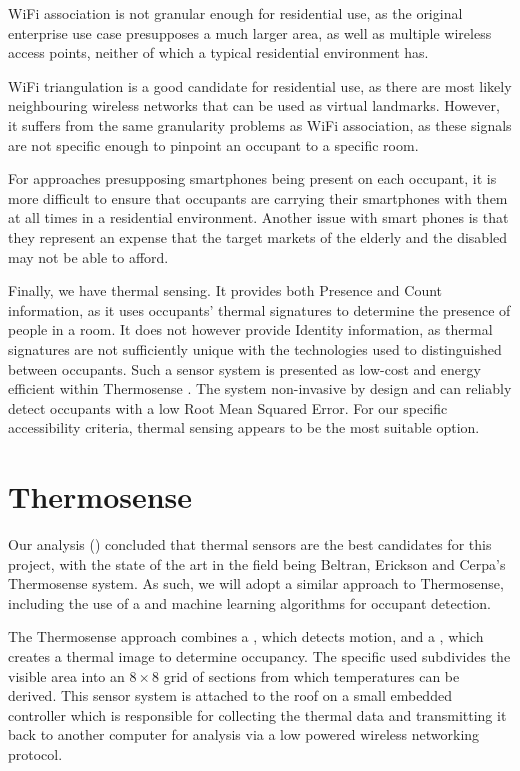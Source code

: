 \documentclass[../thesis/thesis.tex]{subfiles}
\begin{document}
WiFi association is not granular enough for residential use, as the original enterprise use case presupposes a much larger area, as well as multiple wireless access points, neither of which a typical residential environment has.

WiFi triangulation is a good candidate for residential use, as there are most likely neighbouring wireless networks that can be used as virtual landmarks. However, it suffers from the same granularity problems as WiFi association, as these signals are not specific enough to pinpoint an occupant to a specific room.

For approaches presupposing smartphones being present on each occupant, it is more difficult to ensure that occupants are carrying their smartphones with them at all times in a residential environment.  Another issue with smart phones is that they represent an expense that the target markets of the elderly and the disabled may not be able to afford.

Finally, we have thermal sensing. It provides both Presence and Count information, as it uses occupants' thermal signatures to determine the presence of people in a room. It does not however provide Identity information, as thermal signatures are not sufficiently unique with the technologies used to distinguished between occupants. Such a sensor system is presented as low-cost and energy efficient within Thermosense \cite{beltran2013thermosense}. The system non-invasive by design and can reliably detect occupants with a low Root Mean Squared Error. For our specific accessibility criteria, thermal sensing appears to be the most suitable option.

\section{Thermosense}
\label{sec:litreview:thermalsensors}
Our analysis () concluded that thermal sensors are the best candidates for this project, with the state of the art in the field being Beltran, Erickson and Cerpa's Thermosense system. As such, we will adopt a similar approach to Thermosense, including the use of a \iar and machine learning algorithms for occupant detection.

The Thermosense approach combines a \pir, which detects motion, and a \iar, which creates a thermal image to determine occupancy. The specific \iar used subdivides the visible area into an $8\times8$ grid of sections from which temperatures can be derived. This sensor system is attached to the roof on a small embedded controller which is responsible for collecting the thermal data and transmitting it back to another computer for analysis via a low powered wireless networking protocol. 
\end{document}
